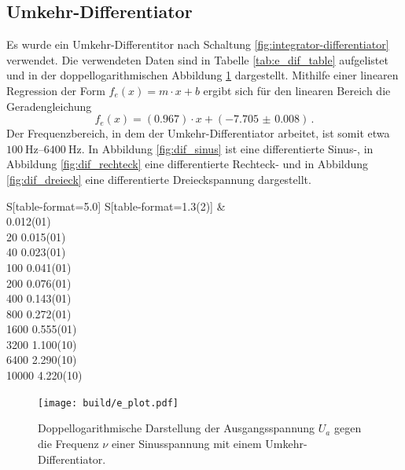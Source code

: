 \subsection{Umkehr-Differentiator}
Es wurde ein Umkehr-Differentitor nach Schaltung \ref{fig:integrator-differentiator} verwendet.
Die verwendeten Daten sind in Tabelle \ref{tab:e_dif_table} aufgelistet und in der doppellogarithmischen Abbildung \ref{fig:e_dif_fig} dargestellt.
Mithilfe einer linearen Regression der Form $f_{e}(x) = m \cdot x + b$ ergibt sich für den linearen Bereich die Geradengleichung
\begin{equation*}
    f_{e}(x) = (\num{0.967}) \cdot x + (\num{-7.705(8)})\,.
\end{equation*}
Der Frequenzbereich, in dem der Umkehr-Differentiator arbeitet, ist somit etwa $\SIrange{100}{6400}{\hertz}$.
In Abbildung \ref{fig:dif_sinus} ist eine differentierte Sinus-, in Abbildung \ref{fig:dif_rechteck} eine differentierte Rechteck- und in Abbildung \ref{fig:dif_dreieck} eine differentierte Dreieckspannung dargestellt.

\begin{table}[!h]
    \centering
    \caption{Aufgenommene Ausgangsspannungen $U_a$ einer Sinusspannung in Abhängigkeit der Frequenz $\nu$ mit einem Umkehr-Differentiator.}
    \label{tab:e_dif_table}
    \begin{tabular}{S[table-format=5.0] S[table-format=1.3(2)]}
    \toprule 
         &  \\
       0.012(01) \\
           20   0.015(01) \\
           40   0.023(01) \\
          100   0.041(01) \\
          200   0.076(01) \\
          400   0.143(01) \\
          800   0.272(01) \\
         1600   0.555(01) \\
         3200   1.100(10) \\
         6400   2.290(10) \\
        10000   4.220(10) \\
    \bottomrule
    \end{tabular}
\end{table}

\begin{figure}[!h]
    \centering
    \texttt{[image: build/e\_plot.pdf]}
    \caption{Doppellogarithmische Darstellung der Ausgangsspannung $U_a$ gegen die Frequenz $\nu$ einer Sinusspannung mit einem Umkehr-Differentiator.}
    \label{fig:e_dif_fig}
\end{figure}


